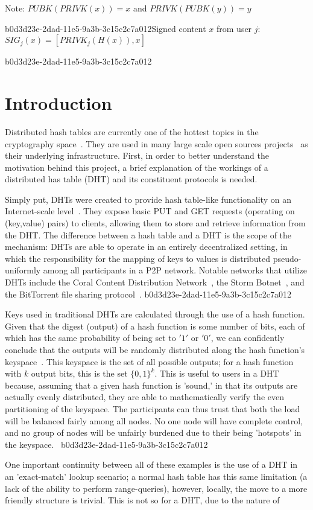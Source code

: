 \documentclass[12pt]{article}
\begin{document}
Note: $PUBK(PRIVK(x)) = x$ and $PRIVK(PUBK(y)) = y$~

b0d3d23e-2dad-11e5-9a3b-3c15c2c7a012Signed content $x$ from user $j$: $SIG_j(x) = \left[ PRIVK_j( H(x) ), x \right]$

b0d3d23e-2dad-11e5-9a3b-3c15c2c7a012\section{Introduction}
\par Distributed hash tables are currently one of the hottest topics in the cryptography space~\cite{Stoica:2001dj,Rowstron:2001ea,Ratnasamy:2001wn}. They are used in many large scale open sources projects~\cite{Freitas:2013tb,Xu:2010vs,Perfitt:2010fh} as their underlying infrastructure. First, in order to better understand the motivation behind this project, a brief explanation of the workings of a distributed has table (DHT) and its constituent protocols is needed.

\par Simply put, DHTs were created to provide hash table-like functionality on an Internet-scale level~\cite{Ratnasamy:2001wn}. They expose basic PUT and GET requests (operating on (key,value) pairs) to clients, allowing them to store and retrieve information from the DHT. The difference between a hash table and a DHT is the scope of the mechanism: DHTs are able to operate in an entirely decentralized setting, in which the responsibility for the mapping of keys to values is distributed pseudo-uniformly among all participants in a P2P network. Notable networks that utilize DHTs include the Coral Content Distribution Network~\cite{Freedman:2004vb}, the Storm Botnet~\cite{Holz:2008uk}, and the BitTorrent file sharing protocol~\cite{Cohen:y1_8mBnw}.
b0d3d23e-2dad-11e5-9a3b-3c15c2c7a012
\par Keys used in traditional DHTs are calculated through the use of a hash function. Given that the digest (output) of a hash function is some number of bits, each of which has the same probability of being set to $'1'$ or $'0'$, we can confidently conclude that the outputs will be randomly distributed along the hash function's keyspace~. This keyspace is the set of all possible outputs; for a hash function with $k$ output bits, this is the set $\{0,1\}^k$. This is useful to users in a DHT because, assuming that a given hash function is 'sound,' in that its outputs are actually evenly distributed, they are able to mathematically verify the even partitioning of the keyspace. The participants can thus trust that both the load will be balanced fairly among all nodes. No one node will have complete control, and no group of nodes will be unfairly burdened due to their being 'hotspots' in the keyspace.~
b0d3d23e-2dad-11e5-9a3b-3c15c2c7a012
\par One important continuity between all of these examples is the use of a DHT in an 'exact-match' lookup scenario; a normal hash table has this same limitation (a lack of the ability to perform range-queries), however, locally, the move to a more friendly structure is trivial. This is not so for a DHT, due to the nature of
\printbibliography
\end{document}
